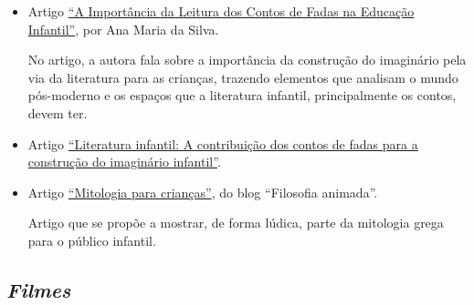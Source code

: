 \documentclass[11pt]{extarticle}
\begin{document}
\begin{itemize}
\item Artigo \href{https://siteantigo.portaleducacao.com.br/conteudo/artigos/educacao/a-importancia-da-leitura-dos-contos-de-fadas-na-educacao-infantil/30151}{``A Importância da Leitura dos Contos de Fadas na Educação Infantil''}, por Ana Maria da Silva.  

No artigo, a autora fala sobre a importância da construção do imaginário pela via da literatura para as crianças, trazendo elementos que analisam o mundo pós-moderno e os espaços que a literatura infantil, principalmente os contos, devem ter.

\item Artigo \href{http://docs.uninove.br/arte/fac/publicacoes/pdf/v3-n1-2012/Francy.pdf}{``Literatura infantil: A contribuição dos contos de fadas para a construção do imaginário infantil''}.

\item Artigo \href{https://danielmcarlos.wordpress.com/2014/02/09/mitologia-para-criancas/}{``Mitologia para crianças''}, do blog ``Filosofia animada''. 

Artigo que se propõe a mostrar, de forma lúdica, parte da mitologia grega para o público infantil.

\end{itemize}

\subsection{\textit{Filmes}}
\end{document}
